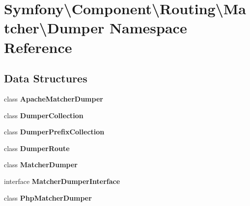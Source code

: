 \section{Symfony\textbackslash{}Component\textbackslash{}Routing\textbackslash{}Matcher\textbackslash{}Dumper Namespace Reference}
\label{namespace_symfony_1_1_component_1_1_routing_1_1_matcher_1_1_dumper}
\subsection*{Data Structures}
\begin{DoxyCompactItemize}
\item 
class {\bf Apache\+Matcher\+Dumper}
\item 
class {\bf Dumper\+Collection}
\item 
class {\bf Dumper\+Prefix\+Collection}
\item 
class {\bf Dumper\+Route}
\item 
class {\bf Matcher\+Dumper}
\item 
interface {\bf Matcher\+Dumper\+Interface}
\item 
class {\bf Php\+Matcher\+Dumper}
\end{DoxyCompactItemize}
